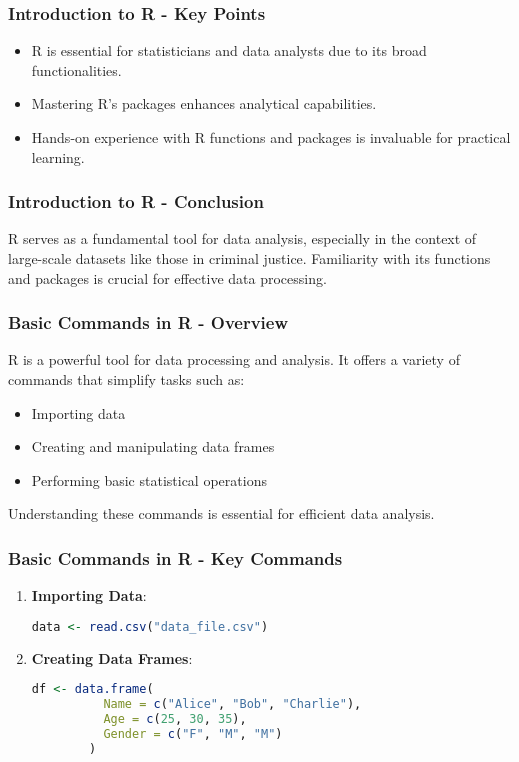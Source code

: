 \documentclass[aspectratio=169]{beamer}
\begin{document}
\begin{frame}[fragile]
    \frametitle{Introduction to R - Key Points}
    \begin{itemize}
        \item R is essential for statisticians and data analysts due to its broad functionalities.
        \item Mastering R's packages enhances analytical capabilities.
        \item Hands-on experience with R functions and packages is invaluable for practical learning.
    \end{itemize}
\end{frame}

\begin{frame}[fragile]
    \frametitle{Introduction to R - Conclusion}
    R serves as a fundamental tool for data analysis, especially in the context of large-scale datasets like those in criminal justice. Familiarity with its functions and packages is crucial for effective data processing.
\end{frame}

\begin{frame}[fragile]
    \frametitle{Basic Commands in R - Overview}
    R is a powerful tool for data processing and analysis. It offers a variety of commands that simplify tasks such as:
    \begin{itemize}
        \item Importing data
        \item Creating and manipulating data frames
        \item Performing basic statistical operations
    \end{itemize}
    Understanding these commands is essential for efficient data analysis.
\end{frame}

\begin{frame}[fragile]
    \frametitle{Basic Commands in R - Key Commands}
    \begin{enumerate}
        \item \textbf{Importing Data}:
        \begin{lstlisting}[language=R]
        data <- read.csv("data_file.csv")
        \end{lstlisting}

        \item \textbf{Creating Data Frames}:
        \begin{lstlisting}[language=R]
        df <- data.frame(
          Name = c("Alice", "Bob", "Charlie"),
          Age = c(25, 30, 35),
          Gender = c("F", "M", "M")
        )
        \end{lstlisting}
    \end{enumerate}
\end{frame}
\end{document}
